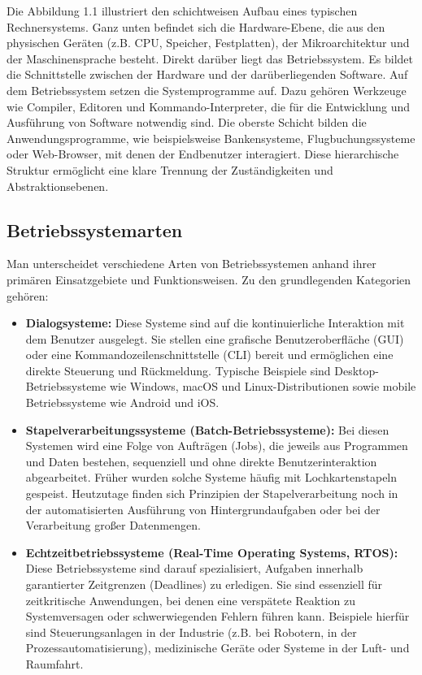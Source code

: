 Die Abbildung 1.1 illustriert den schichtweisen Aufbau eines typischen
Rechnersystems. Ganz unten befindet sich die Hardware-Ebene, die aus den
physischen Geräten (z.B. CPU, Speicher, Festplatten), der Mikroarchitektur und
der Maschinensprache besteht. Direkt darüber liegt das Betriebssystem. Es
bildet die Schnittstelle zwischen der Hardware und der darüberliegenden
Software. Auf dem Betriebssystem setzen die Systemprogramme auf. Dazu gehören
Werkzeuge wie Compiler, Editoren und Kommando-Interpreter, die für die
Entwicklung und Ausführung von Software notwendig sind. Die oberste Schicht
bilden die Anwendungsprogramme, wie beispielsweise Bankensysteme,
Flugbuchungssysteme oder Web-Browser, mit denen der Endbenutzer interagiert.
Diese hierarchische Struktur ermöglicht eine klare Trennung der Zuständigkeiten
und Abstraktionsebenen.

\subsection{Betriebssystemarten}

Man unterscheidet verschiedene Arten von Betriebssystemen anhand ihrer primären
Einsatzgebiete und Funktionsweisen. Zu den grundlegenden Kategorien gehören:

\begin{itemize}
    \item \textbf{Dialogsysteme:} Diese Systeme sind auf die kontinuierliche Interaktion mit dem Benutzer ausgelegt. Sie stellen eine grafische Benutzeroberfläche (GUI) oder eine Kommandozeilenschnittstelle (CLI) bereit und ermöglichen eine direkte Steuerung und Rückmeldung. Typische Beispiele sind Desktop-Betriebssysteme wie Windows, macOS und Linux-Distributionen sowie mobile Betriebssysteme wie Android und iOS.
    \item \textbf{Stapelverarbeitungssysteme (Batch-Betriebssysteme):} Bei diesen Systemen wird eine Folge von Aufträgen (Jobs), die jeweils aus Programmen und Daten bestehen, sequenziell und ohne direkte Benutzerinteraktion abgearbeitet. Früher wurden solche Systeme häufig mit Lochkartenstapeln gespeist. Heutzutage finden sich Prinzipien der Stapelverarbeitung noch in der automatisierten Ausführung von Hintergrundaufgaben oder bei der Verarbeitung großer Datenmengen.
    \item \textbf{Echtzeitbetriebssysteme (Real-Time Operating Systems, RTOS):} Diese Betriebssysteme sind darauf spezialisiert, Aufgaben innerhalb garantierter Zeitgrenzen (Deadlines) zu erledigen. Sie sind essenziell für zeitkritische Anwendungen, bei denen eine verspätete Reaktion zu Systemversagen oder schwerwiegenden Fehlern führen kann. Beispiele hierfür sind Steuerungsanlagen in der Industrie (z.B. bei Robotern, in der Prozessautomatisierung), medizinische Geräte oder Systeme in der Luft- und Raumfahrt.
\end{itemize}

